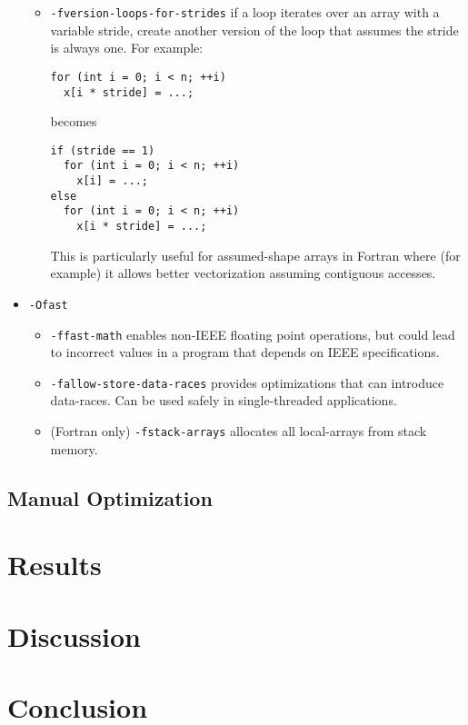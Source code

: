 \documentclass{article}
\begin{document}
\begin{itemize}
\begin{itemize}
                    \item \verb|-fversion-loops-for-strides| if a loop iterates over an array with a variable stride, create another version of the loop that assumes the stride is always one. For example: 
                    \begin{verbatim}
for (int i = 0; i < n; ++i)
  x[i * stride] = ...;
                    \end{verbatim}
                    becomes
                    \begin{verbatim}
if (stride == 1)
  for (int i = 0; i < n; ++i)
    x[i] = ...;
else
  for (int i = 0; i < n; ++i)
    x[i * stride] = ...;
                    \end{verbatim}
                    This is particularly useful for assumed-shape arrays in Fortran where (for example) it allows better vectorization assuming contiguous accesses.
                \end{itemize}
            \item \verb|-Ofast|
                \begin{itemize}
                    \item \verb|-ffast-math| enables non-IEEE floating point operations, but could lead to incorrect values in a program that depends on IEEE specifications.
                    \item \verb|-fallow-store-data-races| provides optimizations that can introduce data-races.  Can be used safely in single-threaded applications.
                    \item (Fortran only) \verb|-fstack-arrays| allocates all local-arrays from stack memory.
                \end{itemize}
        \end{itemize}

    \subsection{Manual Optimization}

\section{Results}

\section{Discussion}

\section{Conclusion}

\nocite{*}
\printbibliography
\end{document}
